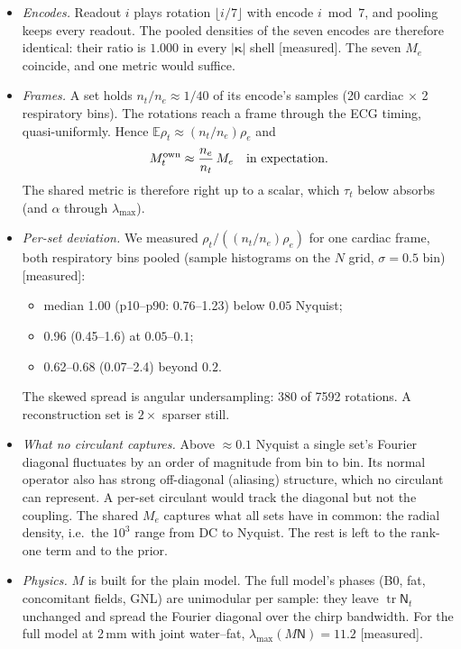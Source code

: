 \documentclass[11pt]{article}
\theoremstyle{remark}
\newcommand{\Nop}{\mathsf N}
\newcommand{\tr}{\operatorname{tr}}
\begin{document}
\begin{itemize}
  \item \emph{Encodes.} Readout $i$ plays rotation $\lfloor i/7\rfloor$ with encode $i\bmod7$, and pooling keeps every readout. The pooled densities of the seven encodes are therefore identical: their ratio is $1.000$ in every $|\bm\kappa|$ shell [measured]. The seven $M_e$ coincide, and one metric would suffice.
  \item \emph{Frames.} A set holds $n_t/n_e\approx1/40$ of its encode's samples (20 cardiac $\times$ 2 respiratory bins). The rotations reach a frame through the ECG timing, quasi-uniformly. Hence $\mathbb E\rho_t\approx(n_t/n_e)\rho_e$ and
  \[
    M_t^{\rm own}\approx\frac{n_e}{n_t}\,M_e\quad\text{in expectation.}
  \]
  The shared metric is therefore right up to a scalar, which $\tau_t$ below absorbs (and $\alpha$ through $\lambda_{\max}$).
  \item \emph{Per-set deviation.} We measured $\rho_t/((n_t/n_e)\rho_e)$ for one cardiac frame, both respiratory bins pooled (sample histograms on the $N$ grid, $\sigma=0.5$ bin) [measured]:
  \begin{itemize}
    \item median 1.00 (p10--p90: 0.76--1.23) below $0.05$ Nyquist;
    \item 0.96 (0.45--1.6) at $0.05$--$0.1$;
    \item 0.62--0.68 (0.07--2.4) beyond $0.2$.
  \end{itemize}
  The skewed spread is angular undersampling: 380 of 7592 rotations. A reconstruction set is $2\times$ sparser still.
  \item \emph{What no circulant captures.} Above $\approx0.1$ Nyquist a single set's Fourier diagonal fluctuates by an order of magnitude from bin to bin. Its normal operator also has strong off-diagonal (aliasing) structure, which no circulant can represent. A per-set circulant would track the diagonal but not the coupling. The shared $M_e$ captures what all sets have in common: the radial density, i.e.\ the $10^3$ range from DC to Nyquist. The rest is left to the rank-one term and to the prior.
  \item \emph{Physics.} $M$ is built for the plain model. The full model's phases (B0, fat, concomitant fields, GNL) are unimodular per sample: they leave $\tr\Nop_t$ unchanged and spread the Fourier diagonal over the chirp bandwidth. For the full model at 2\,mm with joint water--fat, $\lambda_{\max}(M\Nop)=11.2$ [measured].
\end{itemize}
\end{document}
